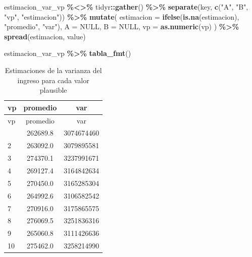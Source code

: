 \documentclass[
  spanish,
  12pt,
]{book}
\newenvironment{Shaded}{\begin{snugshade}}{\end{snugshade}}
\newcommand{\AttributeTok}[1]{\textcolor[rgb]{0.13,0.29,0.53}{#1}}
\newcommand{\ConstantTok}[1]{\textcolor[rgb]{0.56,0.35,0.01}{#1}}
\newcommand{\FunctionTok}[1]{\textcolor[rgb]{0.13,0.29,0.53}{\textbf{#1}}}
\newcommand{\NormalTok}[1]{#1}
\newcommand{\SpecialCharTok}[1]{\textcolor[rgb]{0.81,0.36,0.00}{\textbf{#1}}}
\newcommand{\StringTok}[1]{\textcolor[rgb]{0.31,0.60,0.02}{#1}}
\begin{document}
\begin{Shaded}
\begin{Highlighting}[]
\NormalTok{estimacion\_var\_vp }\SpecialCharTok{\%\textless{}\textgreater{}\%}
\NormalTok{  tidyr}\SpecialCharTok{::}\FunctionTok{gather}\NormalTok{() }\SpecialCharTok{\%\textgreater{}\%}
  \FunctionTok{separate}\NormalTok{(key, }\FunctionTok{c}\NormalTok{(}\StringTok{"A"}\NormalTok{, }\StringTok{"B"}\NormalTok{, }\StringTok{"vp"}\NormalTok{, }\StringTok{"estimacion"}\NormalTok{)) }\SpecialCharTok{\%\textgreater{}\%}
  \FunctionTok{mutate}\NormalTok{(}
    \AttributeTok{estimacion =} \FunctionTok{ifelse}\NormalTok{(}\FunctionTok{is.na}\NormalTok{(estimacion), }\StringTok{"promedio"}\NormalTok{, }\StringTok{"var"}\NormalTok{),}
    \AttributeTok{A =} \ConstantTok{NULL}\NormalTok{, }\AttributeTok{B =} \ConstantTok{NULL}\NormalTok{,}
    \AttributeTok{vp =} \FunctionTok{as.numeric}\NormalTok{(vp)}
\NormalTok{  ) }\SpecialCharTok{\%\textgreater{}\%}
  \FunctionTok{spread}\NormalTok{(estimacion, value)}
\end{Highlighting}
\end{Shaded}

\begin{Shaded}
\begin{Highlighting}[]
\NormalTok{estimacion\_var\_vp }\SpecialCharTok{\%\textgreater{}\%} \FunctionTok{tabla\_fmt}\NormalTok{()}
\end{Highlighting}
\end{Shaded}

\begin{longtable}[]{@{}lcc@{}}
\caption{\label{tab:tab-vp-varianza-ingreso}Estimaciones de la varianza del ingreso para cada valor plausible}\tabularnewline
\toprule\noalign{}
vp & promedio & var \\
\midrule\noalign{}
\endfirsthead
\toprule\noalign{}
vp & promedio & var \\
\midrule\noalign{}
\endhead
\bottomrule\noalign{}
\endlastfoot
1 & 262689.8 & 3074674460 \\
2 & 263092.0 & 3079895581 \\
3 & 274370.1 & 3237991671 \\
4 & 269127.4 & 3164842634 \\
5 & 270450.0 & 3165285304 \\
6 & 264992.6 & 3106582542 \\
7 & 270916.0 & 3175865575 \\
8 & 276069.5 & 3251836316 \\
9 & 265060.8 & 3111426636 \\
10 & 275462.0 & 3258214990 \\
\end{longtable}
\end{document}
